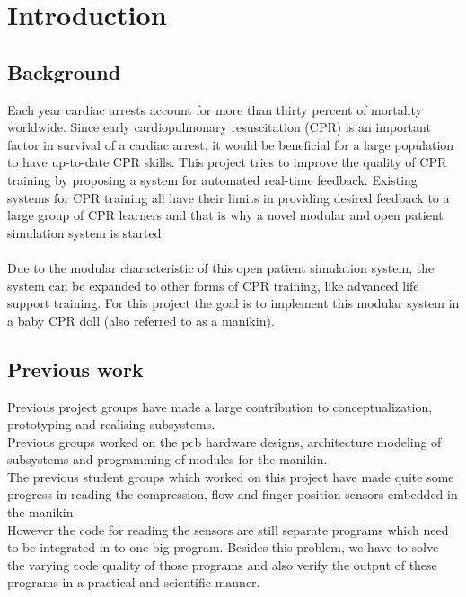 \chapter{Introduction}
\label{chapter:intro}

\section{Background}
Each year cardiac arrests account for more than thirty percent of mortality worldwide. Since
early cardiopulmonary resuscitation (CPR) is an important factor in survival of a cardiac arrest,
it would be beneficial for a large population to have up-to-date CPR skills. This project tries to
improve the quality of CPR training by proposing a system for automated real-time feedback.
Existing systems for CPR training all have their limits in providing desired feedback to a large
group of CPR learners and that is why a novel modular and open patient simulation system is started. \cite{jakortenmsc}\\\\
Due to the modular characteristic of this open patient simulation system, the system can be expanded to other forms of CPR training, like advanced life support training. 
For this project the goal is to implement this modular system in a baby CPR doll (also referred to as a manikin).\\
\section{Previous work}
Previous project groups have made a large contribution to conceptualization, prototyping and realising subsystems. \\
Previous groups worked on the pcb hardware designs, architecture modeling of subsystems and programming of modules for the manikin.\\ 
The previous student groups which worked on this project have made quite some progress in reading the compression, flow and finger position sensors embedded in the manikin.
\\However the code for reading the sensors are still separate programs which need to be integrated in to one big program. Besides this problem, we have to solve the varying code quality of those programs and also verify the output of these programs in a practical and scientific manner.\\\\

